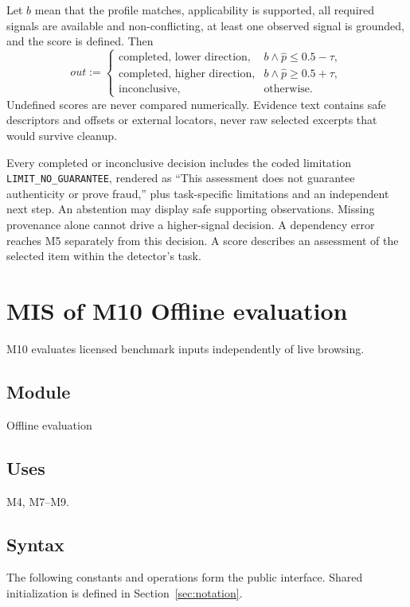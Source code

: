 \documentclass[12pt, titlepage]{article}
\begin{document}
Let $b$ mean that the profile matches, applicability is supported, all required signals are available and non-conflicting, at least one observed signal is grounded, and the score is defined. Then
\[
out:=\begin{cases}
\text{completed, lower direction},& b\land\hat p\le0.5-\tau,\\
\text{completed, higher direction},& b\land\hat p\ge0.5+\tau,\\
\text{inconclusive},&\text{otherwise}.
\end{cases}
\]
Undefined scores are never compared numerically. Evidence text contains safe descriptors and offsets or external locators, never raw selected excerpts that would survive cleanup.

Every completed or inconclusive decision includes the coded limitation \texttt{LIMIT\_\allowbreak{}NO\_\allowbreak{}GUARANTEE}, rendered as ``This assessment does not guarantee authenticity or prove fraud,'' plus task-specific limitations and an independent next step. An abstention may display safe supporting observations. Missing provenance alone cannot drive a higher-signal decision. A dependency error reaches M5 separately from this decision. A score describes an assessment of the selected item within the detector's task.

\clearpage
\section{MIS of M10 Offline evaluation} \label{sec:m10}

M10 evaluates licensed benchmark inputs independently of live browsing.

\subsection{Module}

Offline evaluation

\subsection{Uses}

M4, M7--M9.

\subsection{Syntax}

The following constants and operations form the public interface. Shared initialization is defined in Section~\ref{sec:notation}.
\end{document}
